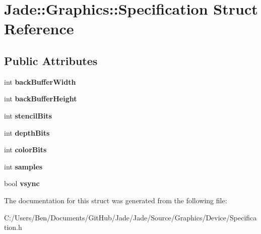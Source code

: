 \hypertarget{struct_jade_1_1_graphics_1_1_specification}{}\section{Jade\+:\+:Graphics\+:\+:Specification Struct Reference}
\label{struct_jade_1_1_graphics_1_1_specification}
\subsection*{Public Attributes}
\begin{DoxyCompactItemize}
\item 
\hypertarget{struct_jade_1_1_graphics_1_1_specification_a76947e56f89284a056142d36549925d1}{}int {\bfseries back\+Buffer\+Width}\label{struct_jade_1_1_graphics_1_1_specification_a76947e56f89284a056142d36549925d1}

\item 
\hypertarget{struct_jade_1_1_graphics_1_1_specification_af66492f2015f718021e8a43a389bfb53}{}int {\bfseries back\+Buffer\+Height}\label{struct_jade_1_1_graphics_1_1_specification_af66492f2015f718021e8a43a389bfb53}

\item 
\hypertarget{struct_jade_1_1_graphics_1_1_specification_ab03f4d62d2f4f653c7663e27277b0962}{}int {\bfseries stencil\+Bits}\label{struct_jade_1_1_graphics_1_1_specification_ab03f4d62d2f4f653c7663e27277b0962}

\item 
\hypertarget{struct_jade_1_1_graphics_1_1_specification_a6e0b73b091d99aaffbd9510fb07df466}{}int {\bfseries depth\+Bits}\label{struct_jade_1_1_graphics_1_1_specification_a6e0b73b091d99aaffbd9510fb07df466}

\item 
\hypertarget{struct_jade_1_1_graphics_1_1_specification_a7c86964edc5f3923a7658b561f4d6bb4}{}int {\bfseries color\+Bits}\label{struct_jade_1_1_graphics_1_1_specification_a7c86964edc5f3923a7658b561f4d6bb4}

\item 
\hypertarget{struct_jade_1_1_graphics_1_1_specification_ad941863bb47f1069f04afe226d1007d0}{}int {\bfseries samples}\label{struct_jade_1_1_graphics_1_1_specification_ad941863bb47f1069f04afe226d1007d0}

\item 
\hypertarget{struct_jade_1_1_graphics_1_1_specification_ab1c4c9ce465199a05169cb9404b76811}{}bool {\bfseries vsync}\label{struct_jade_1_1_graphics_1_1_specification_ab1c4c9ce465199a05169cb9404b76811}

\end{DoxyCompactItemize}


The documentation for this struct was generated from the following file\+:\begin{DoxyCompactItemize}
\item 
C\+:/\+Users/\+Ben/\+Documents/\+Git\+Hub/\+Jade/\+Jade/\+Source/\+Graphics/\+Device/Specification.\+h\end{DoxyCompactItemize}
